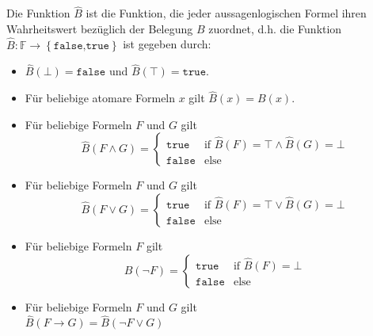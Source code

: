 \begin{minipage}{0.9\linewidth}
Die Funktion $\hat{B}$ ist die Funktion, die jeder aussagenlogischen Formel ihren Wahrheitswert bezüglich der Belegung $B$ zuordnet, d.h. die Funktion $\hat{B}:\mathbb{F}\to\left\{\texttt{false,true}\right\}$ ist gegeben durch:
\begin{itemize}
 \item $\hat{B}(\bot)=\texttt{false}$ und $\hat{B}(\top)=\texttt{true}.$
 \item Für beliebige atomare Formeln $x$ gilt $\hat{B}(x)=B(x)$.
 \item Für beliebige Formeln $F$ und $G$ gilt
 \begin{equation*}
 \hat{B}(F\land G) = 
 \begin{cases}
 \texttt{true} &\text{if } \hat{B}(F)=\top \land \hat{B}(G)=\bot \\
 \texttt{false} &\text{else}
 \end{cases}
 \end{equation*}
 \item Für beliebige Formeln $F$ und $G$ gilt
 \begin{equation*}
 \hat{B}(F\lor G) = 
 \begin{cases}
 \texttt{true} &\text{if } \hat{B}(F)=\top \lor \hat{B}(G)=\bot \\
 \texttt{false} &\text{else}
 \end{cases}
 \end{equation*}
 \item Für beliebige Formeln $F$ gilt
 \begin{equation*}
 \hat{B}(\neg F) = 
 \begin{cases}
 \texttt{true} &\text{if } \hat{B}(F)=\bot \\
 \texttt{false} &\text{else}
 \end{cases}
 \end{equation*}
 \item Für beliebige Formeln $F$ und $G$ gilt \\
 $\hat{B}(F\to G)=\hat{B}(\neg F \lor G)$
 \end{itemize}
 \end{minipage}
\vfill

